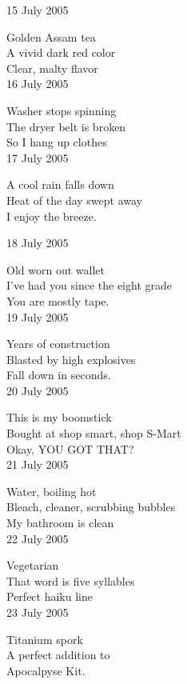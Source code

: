 \documentclass[12pt]{article}
\begin{document}
15 July 2005

Golden Assam tea \\
A vivid dark red color \\
Clear, malty flavor \\

16 July 2005

Washer stops spinning \\
The dryer belt is broken \\
So I hang up clothes \\

17 July 2005

A cool rain falls down \\
Heat of the day swept away \\
I enjoy the breeze. \\

\newpage

18 July 2005

Old worn out wallet \\
I've had you since the eight grade \\
You are mostly tape. \\

19 July 2005

Years of construction \\
Blasted by high explosives \\
Fall down in seconds. \\

20 July 2005

This is my boomstick \\
Bought at shop smart, shop S-Mart \\
Okay, YOU GOT THAT? \\

21 July 2005 

Water, boiling hot \\
Bleach, cleaner, scrubbing bubbles \\
My bathroom is clean \\

22 July 2005

Vegetarian \\
That word is five syllables \\
Perfect haiku line \\

23 July 2005

Titanium spork \\
A perfect addition to \\
Apocalpyse Kit. \\
\end{document}
